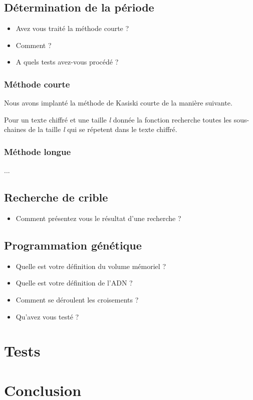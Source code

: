 \documentclass[a4paper, 11pt]{article}
\begin{document}
\subsection{Détermination de la période}

\begin{itemize}
\item Avez vous traité la méthode courte ?
\item Comment ?
\item A quels tests avez-vous procédé ?
\end{itemize}


\subsubsection{Méthode courte}
Nous avons implanté la méthode de Kasiski courte de la manière
suivante.

Pour un texte chiffré et une taille \textit{l} donnée la fonction recherche toutes
les sous-chaines de la taille \textit{l} qui se répetent dans le texte
chiffré.

\subsubsection{Méthode longue}
... 

\subsection{Recherche de crible}
\begin{itemize}
\item Comment présentez vous le résultat d'une recherche ?
\end{itemize}


\subsection{Programmation génétique}
\begin{itemize}
\item Quelle est votre définition du volume mémoriel ?
\item Quelle est votre définition de l'ADN ?
\item Comment se déroulent les croisements ?
\item Qu'avez vous testé ?
\end{itemize}


\section{Tests}

\section{Conclusion}
\end{document}
